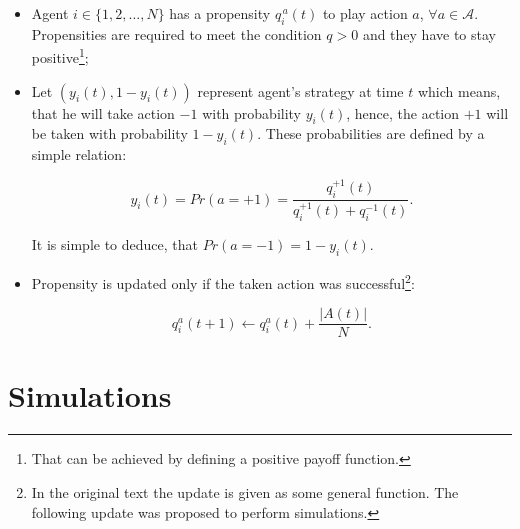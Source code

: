 \documentclass[12pt,american,czech]{article}
\begin{document}
\begin{itemize}

		\item Agent $i\in\{1,2,\dots,N\}$ has a propensity $q_{i}^{\,a}(t)$ to play action $a$, $\forall a\in\mathcal{A}$. Propensities are required to meet the condition $q>0$ and they have to stay positive\footnote{That can be achieved by defining a positive payoff function.};
		\item Let $(y_{i}(t), 1-y_{i}(t))$ represent agent's strategy at time $t$ which means, that he will take action $-1$ with probability $y_{i}(t)$, hence, the action $+1$ will be taken with probability $1-y_{i}(t)$. These probabilities are defined by a simple relation:
		
\begin{equation}
y_{i}(t)=Pr(\mathit{a}=+1)=\frac{q_{i}^{\mathit{+1}}(t)}{q_{i}^{+1}(t)+q_{i}^{-1}(t)}.
\end{equation}

		It is simple to deduce, that $Pr(\mathit{a}=-1)=1-y_{i}(t)$.
		
		\item Propensity is updated only if the taken action was successful\footnote{In the original text \cite{WHITEHEAD2008} the update is given as some general function. The following update was proposed to perform simulations.}:
		
\begin{equation}
q_{i}^{\mathit{a}}(t+1) \leftarrow q_{i}^{\mathit{a}}(t) + \frac{|A(t)|}{N}.
\end{equation}
\end{itemize}

\section{Simulations}


\newpage{}



%

\end{document}
